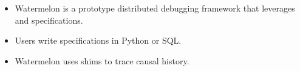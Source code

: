 \begin{itemize}
  \item
    Watermelon is a prototype distributed debugging framework that leverages
    \watprovenance{} and \watprovenance{} specifications.
  \item
    Users write \watprovenance{} specifications in Python or SQL.
  \item
    Watermelon uses shims to trace causal history.
\end{itemize}


